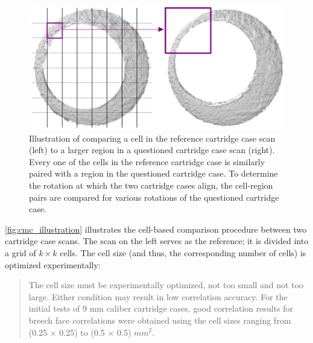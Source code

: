 \begin{Schunk}
\begin{figure}[htbp]

{\centering \includegraphics[width=.75\textwidth]{images/cmc_illustration}

}

\caption{\label{fig:cmc_illustration} Illustration of comparing a cell in the reference cartridge case scan (left) to a larger region in a questioned cartridge case scan (right). Every one of the cells in the reference cartridge case is similarly paired with a region in the questioned cartridge case.  To determine the rotation at which the two cartridge cases align, the cell-region pairs are compared for various rotations of the questioned cartridge case.}\label{fig:unnamed-chunk-11}
\end{figure}
\end{Schunk}

\autoref{fig:cmc_illustration} illustrates the cell-based comparison
procedure between two cartridge case scans. The scan on the left serves
as the reference; it is divided into a grid of \(k \times k\) cells. The
cell size (and thus, the corresponding number of cells) is optimized
experimentally:

\begin{quote}
The cell size must be experimentally optimized, not too small and not
too large. Either condition may result in low correlation accuracy. For
the initial tests of 9 mm caliber cartridge cases, good correlation
results for breech face correlations were obtained using the cell sizes
ranging from (0.25 × 0.25) to (0.5 × 0.5) \(mm^2\). \citep{song_3d_2014}
\end{quote}

